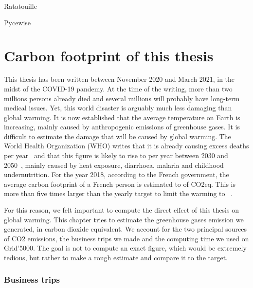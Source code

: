     \lipsum[1]
    \begin{description}
        \item[Ratatouille] \cite{ratatouille}
        \item[Pycewise] \cite{pycewise}
    \end{description}

\chapter{Carbon footprint of this thesis}
\label{chapter:carbon}

    This thesis has been written between November 2020 and March 2021, in the midst of the COVID-19 pandemy. At the time
    of the writing, more than two millions persons already died and several millions will probably have long-term
    medical issues. Yet, this world disaster is arguably much less damaging than global warming. It is now established
    that the average temperature on Earth is increasing, mainly caused by anthropogenic emissions of greenhouse gases.
    It is difficult to estimate the damage that will be caused by global warming. The World Health Organization (WHO)
    writes that it is already causing  excess deaths per year~\cite{who_globalwarming_current} and that this
    figure is likely to rise to  per year between 2030 and 2050~\cite{who_globalwarming_future}, mainly
    caused by heat exposure, diarrhoea, malaria and childhood undernutrition.  For the year 2018, according to the
    French government, the average carbon footprint of a French person is estimated to  of CO2eq.  This
    is more than five times larger than the yearly  target to limit the warming to
    ~\cite{co2_gouv}.

    For this reason, we felt important to compute the direct effect of this thesis on global warming. This chapter tries
    to estimate the greenhouse gases emission we generated, in carbon dioxide equivalent. We account for the two
    principal sources of CO2 emissions, \ie the business trips we made and the computing time we used on Grid'5000.
    The goal is not to compute an exact figure, which would be extremely tedious, but rather to make a rough estimate
    and compare it to the  target.

    \subsection*{Business trips}%

